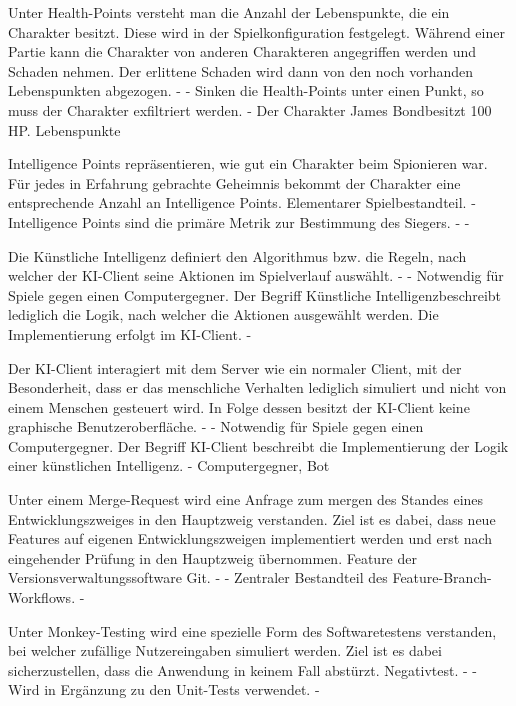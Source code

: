 {Unter Health-Points versteht man die Anzahl der Lebenspunkte, die ein Charakter besitzt. Diese wird in der Spielkonfiguration festgelegt. Während einer Partie kann die Charakter von anderen Charakteren angegriffen werden und Schaden nehmen. Der erlittene Schaden wird dann von den noch vorhanden Lebenspunkten abgezogen.}
{-}
{-}
{Sinken die Health-Points unter einen Punkt, so muss der Charakter exfiltriert werden.}
{-}
{Der Charakter \glqq James Bond\grqq besitzt 100 HP.}
{Lebenspunkte}

{Intelligence Points repräsentieren, wie gut ein Charakter beim Spionieren war. Für jedes in Erfahrung gebrachte Geheimnis bekommt der Charakter eine entsprechende Anzahl an Intelligence Points.}
{Elementarer Spielbestandteil.}
{-}
{Intelligence Points sind die primäre Metrik zur Bestimmung des Siegers.}
{-}
{-}

{Die Künstliche Intelligenz definiert den Algorithmus bzw. die Regeln, nach welcher der KI-Client seine Aktionen im Spielverlauf auswählt.}
{-}
{-}
{Notwendig für Spiele gegen einen Computergegner.}
{Der Begriff \glqq Künstliche Intelligenz\grqq beschreibt lediglich die Logik, nach welcher die Aktionen ausgewählt werden. Die Implementierung erfolgt im KI-Client.}
{-}

{Der KI-Client interagiert mit dem Server wie ein normaler Client, mit der Besonderheit, dass er das menschliche Verhalten lediglich simuliert und nicht von einem Menschen gesteuert wird. In Folge dessen besitzt der KI-Client keine graphische Benutzeroberfläche. }
{-}
{-}
{Notwendig für Spiele gegen einen Computergegner.}
{Der Begriff KI-Client beschreibt die Implementierung der Logik einer künstlichen Intelligenz.}
{-}
{Computergegner, Bot}

{Unter einem Merge-Request wird eine Anfrage zum \glqq mergen \grqq des Standes eines Entwicklungszweiges in den Hauptzweig verstanden. Ziel ist es dabei, dass neue Features auf eigenen Entwicklungszweigen implementiert werden und erst nach eingehender Prüfung in den Hauptzweig übernommen.}
{Feature der Versionsverwaltungssoftware Git.}
{-}
{-}
{Zentraler Bestandteil des Feature-Branch-Workflows.}
{-}

{Unter Monkey-Testing wird eine spezielle Form des Softwaretestens verstanden, bei welcher zufällige Nutzereingaben simuliert werden. Ziel ist es dabei sicherzustellen, dass die Anwendung in keinem Fall abstürzt.}
{Negativtest.}
{-}
{-}
{Wird in Ergänzung zu den Unit-Tests verwendet.}
{-}

